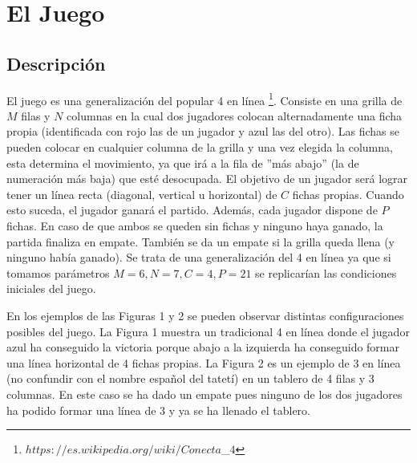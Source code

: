 \documentclass[A4paper,oneside,fleqn,11pt]{article}
\theoremstyle{definition}
\begin{document}
 



\tableofcontents
\clearpage







\section{El Juego}
\subsection{Descripción}
El juego es una generalización del popular 4 en línea \footnote{$https://es.wikipedia.org/wiki/Conecta$\_$4$}. Consiste en una grilla de $M$ filas y $N$ columnas en la cual dos jugadores colocan alternadamente una ficha propia (identificada con rojo las de un jugador y azul las del otro). Las fichas se pueden colocar en cualquier columna de la grilla y una vez elegida la columna, esta determina el movimiento, ya que irá a la fila de ''más abajo'' (la de numeración más baja) que esté desocupada. El objetivo de un jugador será lograr tener un línea recta (diagonal, vertical u horizontal) de $C$ fichas propias. Cuando esto suceda, el jugador ganará el partido. Además, cada jugador dispone de $P$ fichas. En caso de que ambos se queden sin fichas y ninguno haya ganado, la partida finaliza en empate. También se da un empate si la grilla queda llena (y ninguno había ganado). Se trata de una generalización del 4 en línea ya que si tomamos parámetros $M=6, N=7, C=4, P=21$ se replicarían las condiciones iniciales del juego.

En los ejemplos de las Figuras 1 y 2 se pueden observar distintas configuraciones posibles del juego. La Figura 1 muestra un tradicional 4 en línea donde el jugador azul ha conseguido la victoria porque abajo a la izquierda ha conseguido formar una línea horizontal de 4 fichas propias. La Figura 2 es un ejemplo de 3 en línea (no confundir con el nombre español del tatetí) en un tablero de 4 filas y 3 columnas. En este caso se ha dado un empate pues ninguno de los dos jugadores ha podido formar una línea de 3 y ya se ha llenado el tablero.
\end{document}
